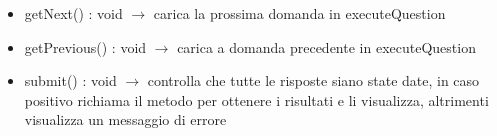 \begin{description}
\begin{itemize}
	\item getNext() : void $\rightarrow$ carica la prossima domanda in executeQuestion
	\item getPrevious() : void $\rightarrow$ carica a domanda precedente in executeQuestion
	\item submit() : void $\rightarrow$ controlla che tutte le risposte siano state date, in caso positivo richiama il metodo per ottenere i risultati e li visualizza, altrimenti visualizza un messaggio di errore
\end{itemize}

\end{description}

\vspace{0.5cm}
\hypertarget{client::controller::student::ExecuteQuestion}{}
